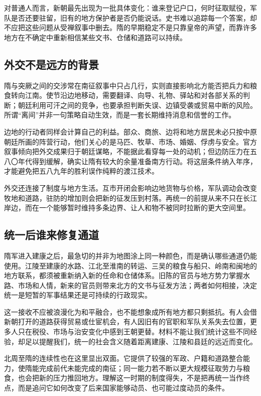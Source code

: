 对普通人而言，新朝最先出现为一批具体变化：谁来登记户口，何时征取赋役，军队是否还要驻留，旧有的地方保护者是否仍能说话。史书难以追踪每一个答案，却不应把这些问题从受禅叙事中删去。隋的早期稳定不是只靠皇帝的声望，而靠许多地方在不确定中重新相信某些文书、仓储和道路可以持续。

\subsection{外交不是远方的背景}

隋与突厥之间的交涉常在南征叙事中只占几行，实则直接影响北方能否把兵力和粮食转向江南。使节沿边地移动，需要翻译、向导、礼物、驿站和对各部关系的判断；朝廷利用可汗之间的竞争，也要承担判断失误、边镇受袭或贸易中断的风险。所谓“离间”并非一句策略自动生效，而是一套长期维持消息和信誉的工作。

边地的行动者同样会计算自己的利益。部众、商旅、边将和地方居民未必只按中原朝廷所画的阵营行动，他们关心的是马匹、牧草、市场、婚姻、俘虏与安全。官方叙事倾向把外交成果归于朝廷谋略，不能据此看穿每一处的动机；但边防压力在五八〇年代得到缓解，确实让隋有较大的余量准备南方行动。将这层条件纳入年序，才能避免把五八九年的胜利误作纯粹的渡江技术。

外交还连接了制度与地方生活。互市开闭会影响边地货物与价格，军队调动会改变牧地和道路，驻防的增加则会把新的征发压到村落。再统一的前提从来不只在长江岸边，而在一个能够暂时维持多条边界、让人和物不被同时拉断的更大空间里。

\subsection{统一后谁来修复通道}

隋军进入建康之后，最急切的并非为地图涂上同一种颜色，而是确认哪些通道仍能使用。江陵至建康的水路、江北至淮南的转运、三吴的粮食与船只、岭南和闽地的地方联系，都须被重新纳入新的任命和仓储体系。旧陈的官员与地方势力掌握水路、市场和人情，新来的官员则带来北方的文书与征发方法；两者如何相接，决定统一是短暂的军事结果还是可持续的行政现实。

这一接收不应被浪漫化为和平融合，也不能想象成所有地方都只剩抵抗。有人会借新朝打开的道路获得贸易或仕宦机会，有人因旧有的官职和军队关系失去位置，更多人只在税役、市场与治安变化中感到王朝更替。材料不能让我们统计这些不同经验，却足以提醒我们，统一的社会含义随着距离建康、江陵和县廷的远近而变化。

北周至隋的连续性也在这里显出双面。它提供了较强的军政、户籍和道路整合能力，使隋能完成前代未能完成的南征；同一能力若不断以更大规模征取劳力与粮食，也会把新的压力推回地方。理解这一时期的制度得失，不是把再统一当作终点，而是追问它如何改变了后来国家能够动员、也可能过度动员的条件。


